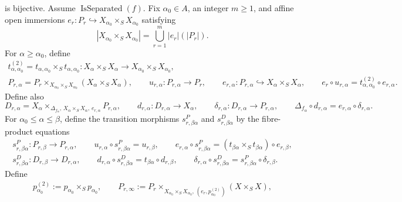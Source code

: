 \begin{definition}
\[  \]
  is bijective.
  Assume \(\operatorname{IsSeparated}(f)\).  Fix $\alpha_0\in A$, an integer $m\geq1$,
  and affine open immersions
  $e_r\colon P_r\hookrightarrow X_{\alpha_0}\times_SX_{\alpha_0}$ satisfying
  \[
    \left|X_{\alpha_0}\times_SX_{\alpha_0}\right|
      =\bigcup_{r=1}^m |e_r|(|P_r|).                            \tag{154}
  \]
  For $\alpha\geq\alpha_0$, define
  \[
  \begin{gathered}
    t^{(2)}_{\alpha,\alpha_0}
      =t_{\alpha,\alpha_0}\times_St_{\alpha,\alpha_0}\colon
      X_\alpha\times_SX_\alpha
        \longrightarrow X_{\alpha_0}\times_SX_{\alpha_0},\\
    P_{r,\alpha}
      =P_r\times_{X_{\alpha_0}\times_SX_{\alpha_0}}
        (X_\alpha\times_SX_\alpha),
    \qquad
    u_{r,\alpha}\colon P_{r,\alpha}\to P_r,\qquad
    e_{r,\alpha}\colon P_{r,\alpha}\hookrightarrow
      X_\alpha\times_SX_\alpha,\qquad
    e_r\circ u_{r,\alpha}
      =t^{(2)}_{\alpha,\alpha_0}\circ e_{r,\alpha}.
  \end{gathered}                                                 \tag{155}
  \]
  Define also
  \[
    D_{r,\alpha}
      =X_\alpha\times_{\Delta_{f_\alpha},\,
          X_\alpha\times_SX_\alpha,\,e_{r,\alpha}}P_{r,\alpha},
    \qquad
    d_{r,\alpha}\colon D_{r,\alpha}\to X_\alpha,\qquad
    \delta_{r,\alpha}\colon D_{r,\alpha}\to P_{r,\alpha},
    \qquad
    \Delta_{f_\alpha}\circ d_{r,\alpha}
      =e_{r,\alpha}\circ\delta_{r,\alpha}.                     \tag{156}
  \]
  For $\alpha_0\leq\alpha\leq\beta$, define the transition morphisms
  $s^P_{r,\beta\alpha}$ and $s^D_{r,\beta\alpha}$ by the fibre-product
  equations
  \[
  \begin{gathered}
    s^P_{r,\beta\alpha}\colon P_{r,\beta}\to P_{r,\alpha},\qquad
    u_{r,\alpha}\circ s^P_{r,\beta\alpha}=u_{r,\beta},\qquad
    e_{r,\alpha}\circ s^P_{r,\beta\alpha}
      =(t_{\beta\alpha}\times_St_{\beta\alpha})\circ e_{r,\beta},\\
    s^D_{r,\beta\alpha}\colon D_{r,\beta}\to D_{r,\alpha},\qquad
    d_{r,\alpha}\circ s^D_{r,\beta\alpha}
      =t_{\beta\alpha}\circ d_{r,\beta},\qquad
    \delta_{r,\alpha}\circ s^D_{r,\beta\alpha}
      =s^P_{r,\beta\alpha}\circ\delta_{r,\beta}.
  \end{gathered}                                                  \tag{FS0}
  \]
  Define
  \[
  \begin{gathered}
    p_{\alpha_0}^{(2)}:=p_{\alpha_0}\times_Sp_{\alpha_0},\qquad
    P_{r,\infty}:=
      P_r\times_{X_{\alpha_0}\times_SX_{\alpha_0},\,
        (e_r,p_{\alpha_0}^{(2)})}(X\times_SX),\\

\end{gathered}\]
\end{definition}
